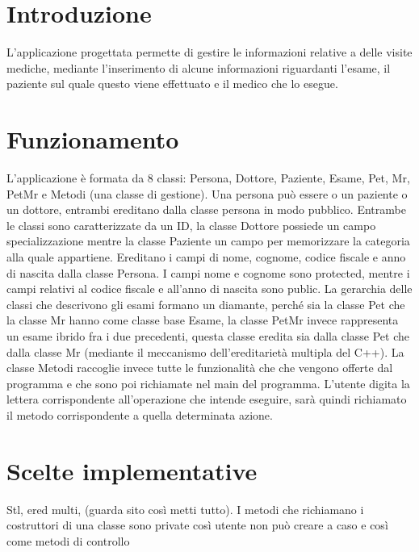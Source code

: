 \documentclass[a4paper,12pt]{article}
\begin{document}
\section*{Introduzione} 
L’applicazione progettata permette di gestire le informazioni relative a delle visite mediche, mediante l’inserimento di alcune informazioni riguardanti l’esame, il paziente sul quale questo viene effettuato e il medico che lo esegue. 


\section*{Funzionamento} 
L’applicazione è formata da 8 classi: Persona, Dottore, Paziente, Esame, Pet, Mr, PetMr e Metodi (una classe di gestione). Una persona può essere o un paziente o un dottore, entrambi ereditano dalla classe persona in modo pubblico. Entrambe le classi sono caratterizzate da un ID, la classe Dottore possiede un campo specializzazione mentre la classe Paziente un campo per memorizzare la categoria alla quale appartiene. Ereditano i campi di nome, cognome, codice fiscale e anno di nascita dalla classe Persona. I campi nome e cognome sono protected, mentre i campi relativi al codice fiscale e all’anno di nascita sono public. La gerarchia delle classi che descrivono gli esami formano un diamante, perché sia la classe Pet che la classe Mr hanno come classe base Esame, la classe PetMr invece rappresenta un esame ibrido fra i due precedenti, questa classe eredita sia dalla classe Pet che dalla classe Mr (mediante il meccanismo dell’ereditarietà multipla del C++). La classe Metodi raccoglie invece tutte le funzionalità che che vengono offerte dal programma e che sono poi richiamate nel main del programma. L’utente digita la lettera corrispondente all’operazione che intende eseguire, sarà quindi richiamato il metodo corrispondente a quella determinata azione. 

\section*{Scelte implementative} 
Stl, ered multi, (guarda sito così metti tutto). 
I metodi che richiamano i costruttori di una classe sono private così utente non può creare a caso e così come metodi di controllo
\end{document}
